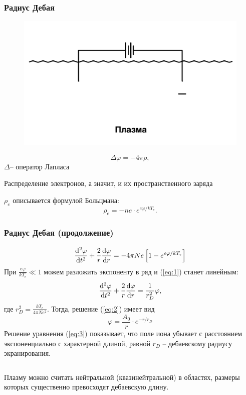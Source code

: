\documentclass[10pt,pdf,hyperref={unicode}, dvipsnames]{beamer}
\renewcommand{\phi}{\varphi}
\begin{document}
\begin{frame}[t]\frametitle{Радиус Дебая}
	\begin{figure}[tb]
		\vspace{0pt}
		\centering
		\includegraphics[width=0.6\linewidth]{fig/debai}
		\label{fig:debai}
		\caption{}
	\end{figure}
\begin{equation}
	\Delta\phi= -4\pi\rho,
\end{equation}
$\Delta$-- оператор Лапласа

Распределение электронов,
а значит, и их пространственного заряда

$\rho_e$ описывается формулой Больцмана:
\begin{equation}
	\rho_e= -ne\cdot e^{e\phi/kT_e}.
\end{equation}


\end{frame}
\begin{frame}[t]\frametitle{Радиус Дебая (продолжение)}
	\begin{equation}
	\label{eq:1}
	\dv[2]{\phi}{t}+\frac2r\dv{\phi}{r}=-4\pi Ne\left[1 -e^{e\phi/kT_e}\right]
\end{equation}
При $\displaystyle \frac{e\phi}{kT_e}\ll1$ можем разложить экспоненту в ряд и (\ref{eq:1}) станет линейным:
\begin{equation}
	\label{eq:2}
	\dv[2]{\phi}{t}+\frac2r\dv{\phi}{r}=\frac{1}{r_D^2}\phi,
\end{equation}
где $\displaystyle r_D^2=\frac{kT_e}{4\pi Ne^2}$.
	Тогда, решение (\ref{eq:2}) имеет вид 
	\begin{equation}
		\label{eq:3}
		\phi=\frac{A_0}{r}\cdot e^{-r/r_D}
	\end{equation}  
    Решение уравнения (\ref{eq:3}) показывает, что поле иона убывает с расстоянием экспоненциально с характерной длиной, равной $r_D$ -- дебаевскому радиусу экранирования. 

    $$\,$$

    Плазму можно считать нейтральной (квазинейтральной) в областях, размеры которых существенно превосходят дебаевскую длину.
\end{frame}
\end{document}
